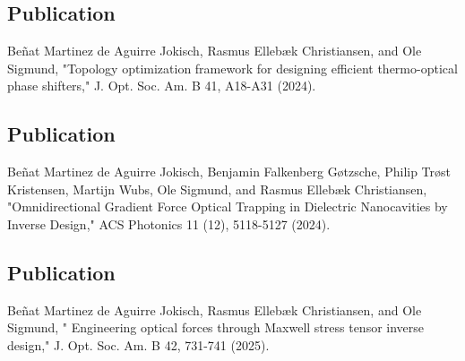 \vspace*{0.4\textheight}
\begin{center}
  \begin{minipage}{0.9\linewidth}
    \section*{Publication \cite{ownpub0}}
    Beñat Martinez de Aguirre Jokisch, Rasmus Ellebæk Christiansen, and Ole Sigmund, "Topology optimization framework for designing efficient thermo-optical phase shifters," J. Opt. Soc. Am. B 41, A18-A31 (2024).
  \end{minipage}
\end{center}
\newpage


\vspace*{0.4\textheight}
\begin{center}
  \begin{minipage}{0.9\linewidth}
    \section*{Publication \cite{ownpub1}}
    Beñat Martinez de Aguirre Jokisch, Benjamin Falkenberg Gøtzsche, Philip Trøst Kristensen, Martijn Wubs, Ole Sigmund, and Rasmus Ellebæk Christiansen, "Omnidirectional Gradient Force Optical Trapping in Dielectric Nanocavities by Inverse Design," ACS Photonics 11 (12), 5118-5127 (2024).
  \end{minipage}
\end{center}
\newpage


\vspace*{0.4\textheight}
\begin{center}
  \begin{minipage}{0.9\linewidth}
    \section*{Publication \cite{ownpub2}}
    Beñat Martinez de Aguirre Jokisch, Rasmus Ellebæk Christiansen, and Ole Sigmund, "
    Engineering optical forces through Maxwell stress tensor inverse design,"  J. Opt. Soc. Am. B 42, 731-741 (2025).
  \end{minipage}
\end{center}
\newpage


